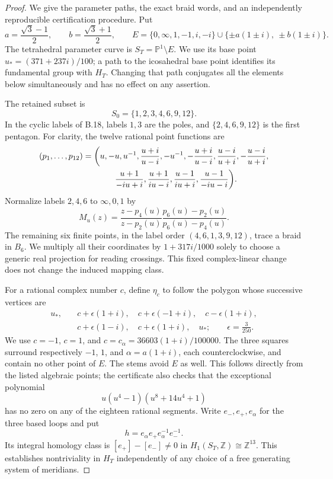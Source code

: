 \begin{proof}
We give the parameter paths, the exact braid words, and
an independently reproducible certification procedure.
Put
\[
 a=\frac{\sqrt3-1}{2},\qquad b=\frac{\sqrt3+1}{2},\qquad
 E=\{0,\infty,1,-1,i,-i\}
       \cup\{\pm a(1\pm i),\ \pm b(1\pm i)\}.
\]
The tetrahedral parameter curve is $S_T=\mathbb P^1\setminus E$.
We use its base point
$u_*=(371+237i)/100$; a path to the icosahedral base point
identifies its fundamental group with $H_T$.
Changing that path conjugates all the elements below
simultaneously and has no effect on any assertion.

The retained subset is
\[
 S_0=\{1,2,3,4,6,9,12\}.
\]
In the cyclic labels of B.18, labels $1,3$ are the poles,
and $\{2,4,6,9,12\}$ is the first pentagon.
For clarity, the twelve rational point functions are
\[
\begin{split}
(p_1,\ldots,p_{12})={}&\bigg(
 u,-u,u^{-1},\frac{u+i}{u-i},-u^{-1},
 -\frac{u+i}{u-i},\frac{u-i}{u+i},-\frac{u-i}{u+i},\\
 &\hspace{9mm}\frac{u+1}{-iu+i},\frac{u+1}{iu-i},
 \frac{u-1}{iu+i},\frac{u-1}{-iu-i}\bigg).
\end{split}
\]
Normalize labels $2,4,6$ to $\infty,0,1$ by
\[
 M_u(z)=\frac{z-p_4(u)}{z-p_2(u)}
             \frac{p_6(u)-p_2(u)}{p_6(u)-p_4(u)}.
\]
The remaining six finite points, in the label order
$(4,6,1,3,9,12)$, trace a braid in $B_6$.
We multiply all their coordinates by
$1+317i/1000$ solely to choose a generic real projection
for reading crossings.  This fixed complex-linear change
does not change the induced mapping class.

For a rational complex number $c$, define $\eta_c$ to
follow the polygon whose successive vertices are
\[
\begin{split}
 u_*,\quad&c+\epsilon(1+i),\quad c+\epsilon(-1+i),\quad
 c-\epsilon(1+i),\\
 &c+\epsilon(1-i),\quad c+\epsilon(1+i),\quad u_*;
 \qquad \epsilon=\frac{3}{250}.
\end{split}
\]
We use $c=-1$, $c=1$, and
$c=c_\alpha=36603(1+i)/100000$.
The three squares surround respectively $-1$, $1$, and
$\alpha=a(1+i)$, each counterclockwise, and contain no
other point of $E$.
The stems avoid $E$ as well.  This follows directly from
the listed algebraic points; the certificate also checks
that the exceptional polynomial
\[
 u(u^4-1)(u^8+14u^4+1)
\]
has no zero on any of the eighteen rational segments.
Write $e_-,e_+,e_\alpha$ for the three based loops and put
\[
 h=e_\alpha e_+e_\alpha^{-1}e_-^{-1}.
 \tag{B.56.1}
\]
Its integral homology class is
$[e_+]-[e_-]\ne0$ in
$H_1(S_T,\mathbb Z)\cong\mathbb Z^{13}$.
This establishes nontriviality in $H_T$ independently of
any choice of a free generating system of meridians.


\end{proof}
